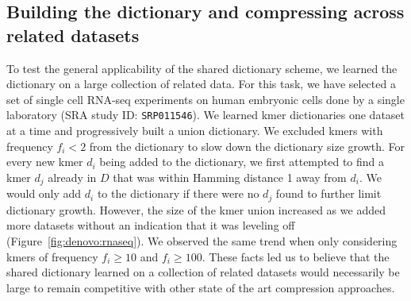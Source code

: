 \documentclass[12pt]{cmuthesis}
\begin{document}
  
  
  \subsection{Building the dictionary and compressing across related datasets}


    To test the general applicability of the shared dictionary scheme, we learned the dictionary on a large collection of related data. For this task, we have selected a set of single cell RNA-seq experiments on human embryonic cells done by a single laboratory (SRA study ID: \texttt{SRP011546}). We learned kmer dictionaries one dataset at a time and progressively built a union dictionary. We excluded kmers with frequency $f_i < 2$ from the dictionary to slow down the dictionary size growth. For every new kmer $d_i$ being added to the dictionary, we first attempted to find a kmer $d_j$ already in $D$ that was within Hamming distance 1 away from $d_i$. We would only add $d_i$ to the dictionary if there were no $d_j$ found to further limit dictionary growth. However, the size of the kmer union increased as we added more datasets  without an indication that it was leveling off (Figure~\ref{fig:denovo:rnaseq}). We observed the same trend when only considering kmers of frequency $f_i \ge 10$ and $f_i \ge 100$. These facts led us to believe that the shared dictionary learned on a collection of related datasets would necessarily be large to remain competitive with other state of the art compression approaches.
\end{document}
